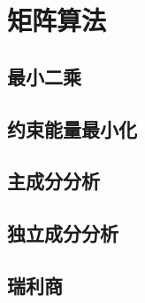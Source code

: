 \chapter{矩阵算法}
\section{最小二乘}

\section{约束能量最小化}

\section{主成分分析}

\section{独立成分分析}

\section{瑞利商}

